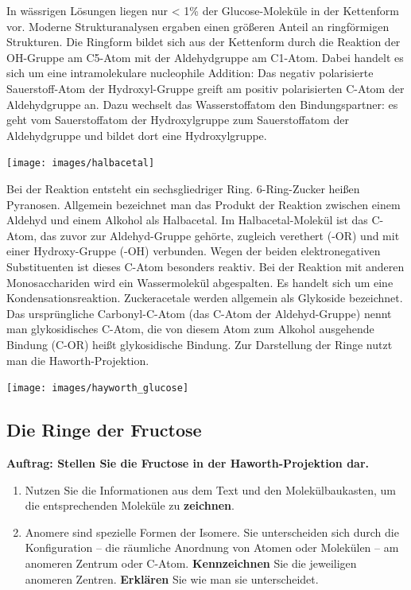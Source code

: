 \documentclass{scrartcl}  %
\begin{document}
\begin{tcolorbox}
				In wässrigen Lösungen liegen nur < 1\% der Glucose-Moleküle in der Kettenform vor. Moderne Strukturanalysen ergaben einen größeren Anteil an ringförmigen Strukturen. \newline 
				Die Ringform bildet sich aus der Kettenform durch die Reaktion der OH-Gruppe am C5-Atom mit der Aldehydgruppe am C1-Atom. Dabei handelt es sich um eine intramolekulare nucleophile Addition: Das negativ polarisierte Sauerstoff-Atom der Hydroxyl-Gruppe greift am positiv polarisierten C-Atom der Aldehydgruppe an. Dazu wechselt das Wasserstoffatom den Bindungspartner: es geht vom Sauerstoffatom der Hydroxylgruppe zum Sauerstoffatom der Aldehydgruppe und bildet dort eine Hydroxylgruppe. \newline
				\begin{center}
					\texttt{[image: images/halbacetal]}
				\end{center}
				Bei der Reaktion entsteht ein sechsgliedriger Ring. 6-Ring-Zucker heißen Pyranosen.  Allgemein bezeichnet man das Produkt der Reaktion zwischen einem Aldehyd und einem Alkohol als Halbacetal. Im Halbacetal-Molekül ist das C-Atom, das zuvor zur Aldehyd-Gruppe gehörte, zugleich verethert (-OR) und mit einer Hydroxy-Gruppe (-OH) verbunden. Wegen der beiden elektronegativen Substituenten ist dieses C-Atom besonders reaktiv. Bei der Reaktion mit anderen Monosacchariden wird ein Wassermolekül abgespalten. Es handelt sich um eine Kondensationsreaktion. Zuckeracetale werden allgemein als Glykoside bezeichnet. Das ursprüngliche Carbonyl-C-Atom (das C-Atom der Aldehyd-Gruppe) nennt man glykosidisches C-Atom, die von diesem Atom zum Alkohol ausgehende Bindung (C-OR) heißt glykosidische Bindung. \newline
				Zur Darstellung der Ringe nutzt man die Haworth-Projektion.		
				\begin{center}
					\texttt{[image: images/hayworth\_glucose]}
				\end{center}		
			\end{tcolorbox}
			
		\subsection{Die Ringe der Fructose}
			
			\textbf{Auftrag: Stellen Sie die Fructose in der Haworth-Projektion dar.}
			\begin{enumerate}
				\item Nutzen Sie die Informationen aus dem Text und den Molekülbaukasten, um die entsprechenden Moleküle zu \textbf{zeichnen}.
			    \item Anomere sind spezielle Formen der Isomere. Sie unterscheiden sich durch die Konfiguration – die räumliche Anordnung von Atomen oder Molekülen – am anomeren Zentrum oder C-Atom. \textbf{Kennzeichnen} Sie die jeweiligen anomeren Zentren. \textbf{Erklären} Sie wie man sie unterscheidet. 
			\end{enumerate} 
			
\end{document}
